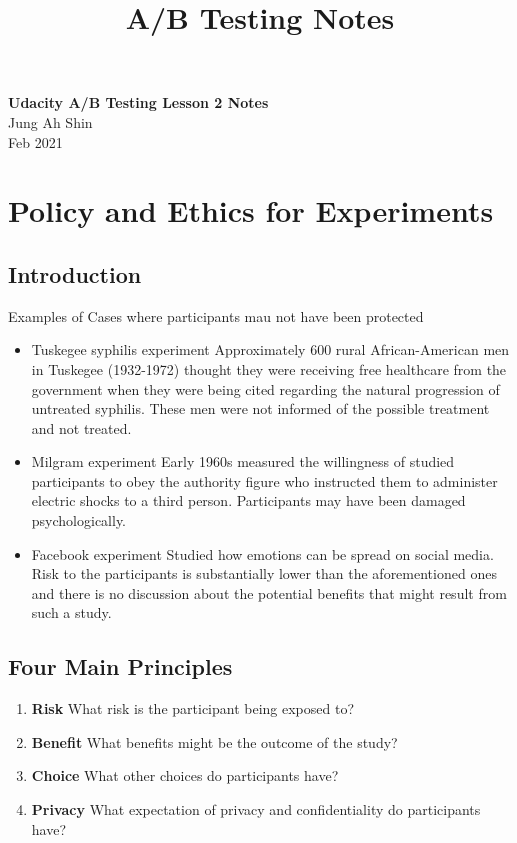 \documentclass[10pt]{article}
\theoremstyle{definition}
\begin{document}
\setcounter{section}{0}
\title{A/B Testing Notes}

\thispagestyle{empty}

\begin{center}
{\LARGE \bf Udacity A/B Testing Lesson 2 Notes}\\
{\large Jung Ah Shin}\\
Feb 2021
\end{center}
\section{Policy and Ethics for Experiments}
\subsection{Introduction}
Examples of Cases where participants mau not have been protected
\begin{itemize}
    \item Tuskegee syphilis experiment
    Approximately 600 rural African-American men in Tuskegee (1932-1972) thought they were receiving free healthcare from the government when they were being cited regarding the natural progression of untreated syphilis. These men were not informed of the possible treatment and not treated.
    \item Milgram experiment
    Early 1960s measured the willingness of studied participants to obey the authority figure who instructed them to administer electric shocks to a third person. Participants may have been damaged psychologically.
    \item Facebook experiment
    Studied how emotions can be spread on social media. Risk to the participants is substantially lower than the aforementioned ones and there is no discussion about the potential benefits that might result from such a study.
\end{itemize}

\subsection{Four Main Principles}

\begin{shaded}
\begin{enumerate}
    \item \textbf{Risk}
    What risk is the participant being exposed to?
    \item \textbf{Benefit}
    What benefits might be the outcome of the study?
    \item \textbf{Choice}
    What other choices do participants have?
    \item \textbf{Privacy}
    What expectation of privacy and confidentiality do participants have?
\end{enumerate}
\end{shaded}
\end{document}
